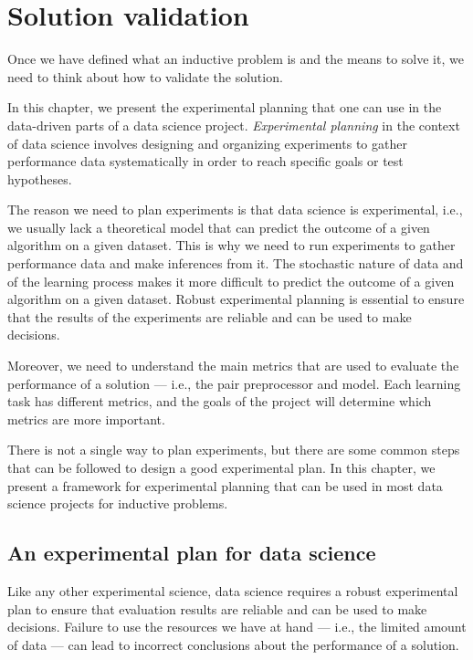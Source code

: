 \chapter{Solution validation}
\label{chap:planning}

Once we have defined what an inductive problem is and the means to solve it, we need to
think about how to validate the solution.

In this chapter, we present the experimental planning that one can use in the data-driven
parts of a data science project.  \emph{Experimental planning}  in the context of data
science involves designing and organizing experiments to gather performance data
systematically in order to reach specific goals or test hypotheses.

The reason we need to plan experiments is that data science is experimental, i.e., we
usually lack a theoretical model that can predict the outcome of a given algorithm on a
given dataset.  This is why we need to run experiments to gather performance data and make
inferences from it.  The stochastic nature of data and of the learning process makes it
more difficult to predict the outcome of a given algorithm on a given dataset.  Robust
experimental planning is essential to ensure that the results of the experiments are
reliable and can be used to make decisions.

Moreover, we need to understand the main metrics that are used to evaluate the performance
of a solution --- i.e., the pair preprocessor and model.  Each learning task has different
metrics, and the goals of the project will determine which metrics are more important.

There is not a single way to plan experiments, but there are some common steps that can
be followed to design a good experimental plan.  In this chapter, we present a
framework for experimental planning that can be used in most data science projects
for inductive problems.



\section{An experimental plan for data science}

Like any other experimental science, data science requires a robust experimental
plan to ensure that evaluation results are reliable and can be used to make decisions.
Failure to use the resources we have at hand --- i.e., the limited amount of data ---
can lead to incorrect conclusions about the performance of a solution.

